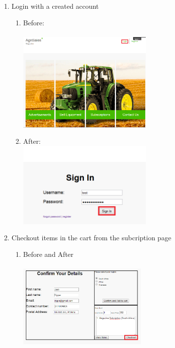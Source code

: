 \documentclass[11pt]{article}
\begin{document}
\begin{enumerate}
		\item Login with a created account
			\begin{enumerate}
				\item Before: \\ \\
					\includegraphics[width=0.55\textwidth]{../Images/Tasks/login_act2.png}
				\item After: \\
					\includegraphics[width=0.55\textwidth]{../Images/Tasks/login_act.png}
			\end{enumerate}
		
		\item Checkout items in the cart from the subcription page
			\begin{enumerate}
				\item Before and After \\ \\ 
					\includegraphics[width=0.53\textwidth]{../Images/Tasks/checkout.png}
			\end{enumerate}


\end{enumerate}
\end{document}
